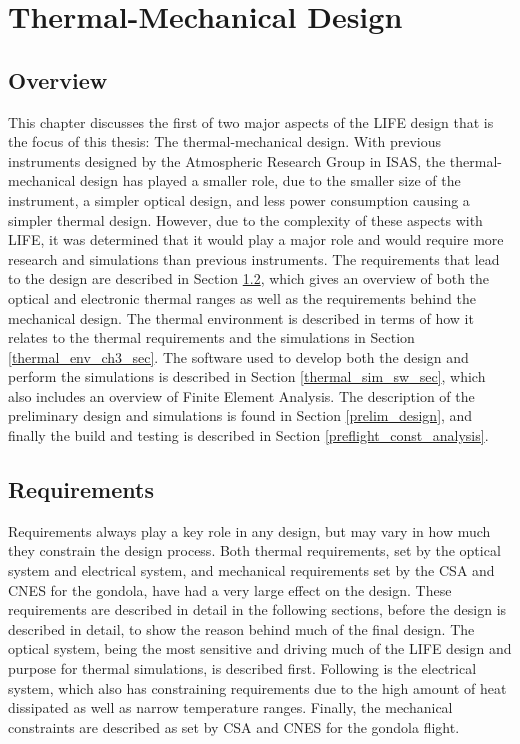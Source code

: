 \chapter{Thermal-Mechanical Design}  \label{thermal}

\section{Overview}
This chapter discusses the first of two major aspects of the LIFE design that is the focus of this thesis: The thermal-mechanical design. With previous instruments designed by the Atmospheric Research Group in ISAS, the thermal-mechanical design has played a smaller role, due to the smaller size of the instrument, a simpler optical design, and less power consumption causing a simpler thermal design. However, due to the complexity of these aspects with LIFE, it was determined that it would play a major role and would require more research and simulations than previous instruments. The requirements that lead to the design are described in Section \ref{thermal_req_section}, which gives an overview of both the optical and electronic thermal ranges as well as the requirements behind the mechanical design. The thermal environment is described in terms of how it relates to the thermal requirements and the simulations in Section \ref{thermal_env_ch3_sec}. The software used to develop both the design and perform the simulations is described in Section \ref{thermal_sim_sw_sec}, which also includes an overview of Finite Element Analysis. The description of the preliminary design and simulations is found in Section \ref{prelim_design}, and finally the build and testing is described in Section \ref{preflight_const_analysis}.

\section{Requirements}\label{thermal_req_section}
Requirements always play a key role in any design, but may vary in how much they constrain the design process. Both thermal requirements, set by the optical system and electrical system, and mechanical requirements set by the CSA and CNES for the gondola, have had a very large effect on the design. These requirements are described in detail in the following sections, before the design is described in detail, to show the reason behind much of the final design. The optical system, being the most sensitive and driving much of the LIFE design and purpose for thermal simulations, is described first. Following is the electrical system, which also has constraining requirements due to the high amount of heat dissipated as well as narrow temperature ranges. Finally, the mechanical constraints are described as set by CSA and CNES for the gondola flight.


